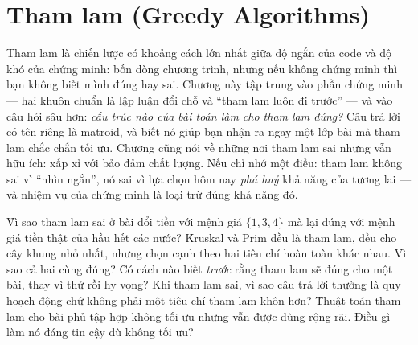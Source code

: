 \documentclass[../../algorithm.tex]{subfiles}
\begin{document}
\chapter{Tham lam (Greedy Algorithms)}

\begin{tomtat}
Tham lam là chiến lược có khoảng cách lớn nhất giữa độ ngắn của code và độ khó của chứng minh: bốn dòng chương trình, nhưng nếu không chứng minh thì bạn không biết mình đúng hay sai. Chương này tập trung vào phần chứng minh --- hai khuôn chuẩn là lập luận đổi chỗ và ``tham lam luôn đi trước'' --- và vào câu hỏi sâu hơn: \emph{cấu trúc nào của bài toán làm cho tham lam đúng?} Câu trả lời có tên riêng là matroid, và biết nó giúp bạn nhận ra ngay một lớp bài mà tham lam chắc chắn tối ưu. Chương cũng nói về những nơi tham lam sai nhưng vẫn hữu ích: xấp xỉ với bảo đảm chất lượng. Nếu chỉ nhớ một điều: tham lam không sai vì ``nhìn ngắn'', nó sai vì lựa chọn hôm nay \emph{phá huỷ} khả năng của tương lai --- và nhiệm vụ của chứng minh là loại trừ đúng khả năng đó.
\end{tomtat}

\begin{nentang}
\end{nentang}

\begin{khoigoi}
\h{Vì sao tham lam sai ở bài đổi tiền với mệnh giá \(\{1,3,4\}\) mà lại đúng với mệnh giá tiền thật của hầu hết các nước?}
\h{Kruskal và Prim đều là tham lam, đều cho cây khung nhỏ nhất, nhưng chọn cạnh theo hai tiêu chí hoàn toàn khác nhau. Vì sao cả hai cùng đúng?}
\h{Có cách nào biết \emph{trước} rằng tham lam sẽ đúng cho một bài, thay vì thử rồi hy vọng?}
\h{Khi tham lam sai, vì sao câu trả lời thường là quy hoạch động chứ không phải một tiêu chí tham lam khôn hơn?}
\h{Thuật toán tham lam cho bài phủ tập hợp không tối ưu nhưng vẫn được dùng rộng rãi. Điều gì làm nó đáng tin cậy dù không tối ưu?}
\end{khoigoi}
\end{document}
